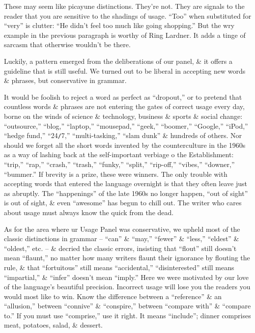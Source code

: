 \documentclass{article}
\begin{document}
These may seem like picayune distinctions. They're not. They are signals to the reader that you are sensitive to the shadings of usage. ``Too'' when substituted for ``very'' is clutter: ``He didn't feel too much like going shopping.'' But the wry example in the previous paragraph is worthy of Ring Lardner. It adds a tinge of sarcasm that otherwise wouldn't be there.

Luckily, a pattern emerged from the deliberations of our panel, \& it offers a guideline that is still useful. We turned out to be liberal in accepting new words \& phrases, but conservative in grammar.

It would be foolish to reject a word as perfect as ``dropout,'' or to pretend that countless words \& phrases are not entering the gates of correct usage every day, borne on the winds of science \& technology, business \& sports \& social change: ``outsource,'' ``blog,'' ``laptop,'' ``mousepad,'' ``geek,'' ``boomer,'' ``Google,'' ``iPod,'' ``hedge fund,'' ``24{\tt/}7,'' ``multi-tasking,'' ``slam dunk'' \& hundreds of others. Nor should we forget all the short words invented by the counterculture in the 1960s as a way of lashing back at the self-important verbiage o the Establishment: ``trip,'' ``rap,'' ``crash,'' ``trash,'' ``funky,'' ``split,'' ``rip-off,'' ``vibes,'' ``downer,'' ``bummer.'' If brevity is a prize, these were winners. The only trouble with accepting words that entered the language overnight is that they often leave just as abruptly. The ``happenings'' of the late 1960s no longer happen, ``out of sight'' is out of sight, \& even ``awesome'' has begun to chill out. The writer who cares about usage must always know the quick from the dead.

As for the area where ur Usage Panel was conservative, we upheld most of the classic distinctions in grammar -- ``can'' \& ``may,'' ``fewer'' \& ``less,'' ``eldest'' \& ``oldest,'' etc. -- \& decried the classic errors, insisting that ``flout'' still doesn't mean ``flaunt,'' no matter how many writers flaunt their ignorance by flouting the rule, \& that ``fortuitous'' still means ``accidental,'' ``disinterested'' still means ``impartial,'' \& ``infer'' doesn't mean ``imply.'' Here we were motivated by our love of the language's beautiful precision. Incorrect usage will lose you the readers you would most like to win. Know the difference between a ``reference'' \& an ``allusion,'' between ``connive'' \& ``conspire,'' between ``compare with'' \& ``compare to.'' If you must use ``comprise,'' use it right. It means ``include''; dinner comprises meat, potatoes, salad, \& dessert.
\end{document}
